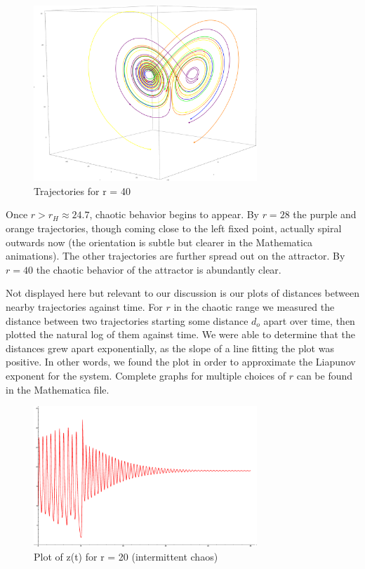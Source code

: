 \documentclass{report}
\begin{document}
\begin{figure}[ht]
  \centering
  \includegraphics[width=0.75\textwidth]{r40.eps}
  \caption{Trajectories for r = 40}
  \label{fig:r_40}
\end{figure}

Once \(r > r_H \approx 24.7 \), chaotic behavior begins to appear. By \(r = 28\)
the purple and orange trajectories, though coming close to the left fixed
point, actually spiral outwards now (the orientation is subtle but clearer
in the Mathematica animations). The other trajectories are further spread
out on the attractor. By \(r = 40\) the chaotic behavior of the attractor is
abundantly clear.

Not displayed here but relevant to our discussion is our plots of distances
between nearby trajectories against time. For \(r\) in the chaotic range we
measured the distance between two trajectories starting some distance \(d_o\)
apart over time, then plotted the natural log of them against time. We were
able to determine that the distances grew apart exponentially, as the slope
of a line fitting the plot was positive. In other words, we found the plot
in order to approximate the Liapunov exponent for the system. Complete graphs
for multiple choices of \(r\) can be found in the Mathematica file.

\begin{figure}[ht]
  \centering
  \includegraphics[width=0.75\textwidth]{z-r20.eps}
  \caption{Plot of z(t) for r = 20 (intermittent chaos)}
  \label{fig:z-r20}
\end{figure}
\end{document}
